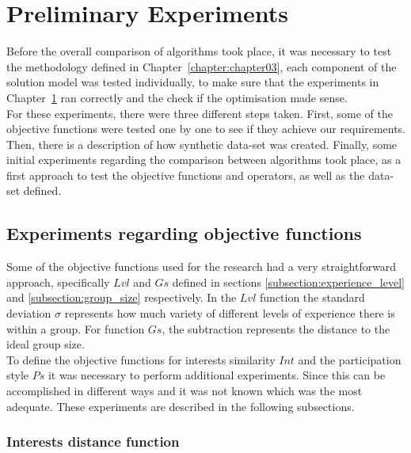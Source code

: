 \chapter{Preliminary Experiments}
\label{chapter:chapter04}

Before the overall comparison of algorithms took place, it was necessary to test the methodology defined in Chapter~\ref{chapter:chapter03}, each component of the solution model was tested individually, to make sure that the experiments in Chapter~\ref{chapter:chapter04} ran correctly and the check if the optimisation made sense.\\

For these experiments, there were three different steps taken. First, some of the objective functions were tested one by one to see if they achieve our requirements. Then, there is a description of how synthetic data-set was created. Finally, some initial experiments regarding the comparison between algorithms took place, as a first approach to test the objective functions and operators, as well as the data-set defined.

\section{Experiments regarding objective functions}

Some of the objective functions used for the research had a very straightforward approach, specifically $Lvl$ and $Gs$ defined in sections \ref{subsection:experience_level} and \ref{subsection:group_size} respectively. In the $Lvl$ function the standard deviation $\sigma$ represents how much variety of different levels of experience there is within a group. For function $Gs$, the subtraction represents the distance to the ideal group size.\\

To define the objective functions for interests similarity $Int$ and the participation style $Ps$ it was necessary to perform additional experiments. Since this can be accomplished in different ways and it was not known which was the most adequate. These experiments are described in the following subsections. \\

\subsection{Interests distance function}


